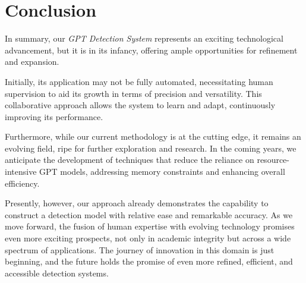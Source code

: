 \chapter{Conclusion}

In summary, our \textit{GPT Detection System} represents an exciting technological advancement, but it is in its infancy, 
offering ample opportunities for refinement and expansion.

Initially, its application may not be fully automated, necessitating human supervision to aid its growth in terms of 
precision and versatility. This collaborative approach allows the system to learn and adapt, continuously improving 
its performance.

Furthermore, while our current methodology is at the cutting edge, it remains an evolving field, ripe for further 
exploration and research. In the coming years, we anticipate the development of techniques that reduce the reliance 
on resource-intensive GPT models, addressing memory constraints and enhancing overall efficiency.

Presently, however, our approach already demonstrates the capability to construct a detection model with relative 
ease and remarkable accuracy. As we move forward, the fusion of human expertise with evolving technology promises 
even more exciting prospects, not only in academic integrity but across a wide spectrum of applications. The journey 
of innovation in this domain is just beginning, and the future holds the promise of even more refined, efficient, 
and accessible detection systems.